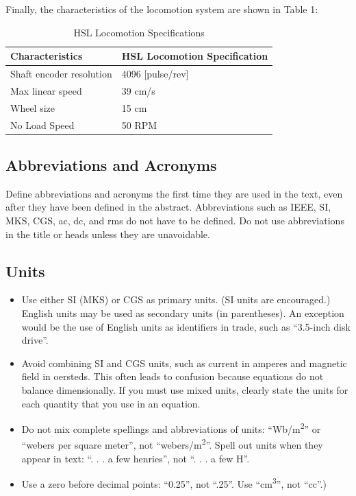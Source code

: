 \documentclass[conference]{IEEEtran}
\begin{document}
Finally, the characteristics of the locomotion system are shown in Table 1:

\begin{table}[htbp]
\centering
\caption{HSL Locomotion Specifications}
\begin{tabular}{|l|l|}
\hline
\textbf{Characteristics}   & \textbf{HSL Locomotion Specification} \\ \hline
Shaft encoder resolution   & 4096 [pulse/rev]                      \\ \hline
Max linear speed           & 39 cm/s                               \\ \hline
Wheel size                 & 15 cm                                 \\ \hline
No Load Speed              & 50 RPM                                \\ \hline
\end{tabular}
\label{tab:hsl_locomotion}
\end{table}


\subsection{Abbreviations and Acronyms}\label{AA}
Define abbreviations and acronyms the first time they are used in the text, 
even after they have been defined in the abstract. Abbreviations such as 
IEEE, SI, MKS, CGS, ac, dc, and rms do not have to be defined. Do not use 
abbreviations in the title or heads unless they are unavoidable.

\subsection{Units}
\begin{itemize}
\item Use either SI (MKS) or CGS as primary units. (SI units are encouraged.) English units may be used as secondary units (in parentheses). An exception would be the use of English units as identifiers in trade, such as ``3.5-inch disk drive''.
\item Avoid combining SI and CGS units, such as current in amperes and magnetic field in oersteds. This often leads to confusion because equations do not balance dimensionally. If you must use mixed units, clearly state the units for each quantity that you use in an equation.
\item Do not mix complete spellings and abbreviations of units: ``Wb/m\textsuperscript{2}'' or ``webers per square meter'', not ``webers/m\textsuperscript{2}''. Spell out units when they appear in text: ``. . . a few henries'', not ``. . . a few H''.
\item Use a zero before decimal points: ``0.25'', not ``.25''. Use ``cm\textsuperscript{3}'', not ``cc''.)
\end{itemize}
\end{document}
